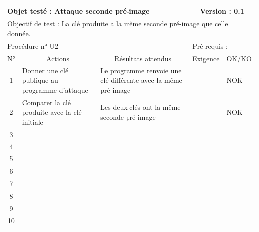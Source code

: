 \documentclass{../res/univ-projet}
\begin{document}
\begin{center}
    \begin{tabular}{|c|p{5cm}|p{5cm}|p{1.5cm}|p{1.5cm}|}
      \hline
      \multicolumn{3}{|l|}{Objet testé : Attaque seconde pré-image} & \multicolumn{2}{c|}{Version : 0.1}\\ \hline
      \multicolumn{5}{|l|}{Objectif de test : La clé produite a la même seconde pré-image que celle donnée.}\\ \hline
      \multicolumn{3}{|l|}{Procédure n° U2} & \multicolumn{2}{p{3cm}|}{Pré-requis : }\\ \hline
      \multicolumn{1}{|c|}{N°} & \multicolumn{1}{c|}{Actions} & \multicolumn{1}{c|}{Résultats attendus} & 
      \multicolumn{1}{c|}{Exigence} & \multicolumn{1}{c|}{OK/KO}\\ \hline
      1 & Donner une clé publique au programme d'attaque & Le programme renvoie une clé différente avec la même pré-image &  & NOK \\
      2 & Comparer la clé produite avec la clé initiale & Les deux clés ont la même seconde pré-image &  & NOK \\
      3 &  &  &  & \\ 
	  4 &  &  &  & \\
      5 &  &  &  & \\
	  6 &  &  &  & \\
      7 &  &  &  & \\
      8 &  &  &  & \\
      9 &  &  &  & \\
      10 &  &  &  &\\ 
	\hline
    \end{tabular}
    \vskip 2.2cm






\end{center}
\end{document}
